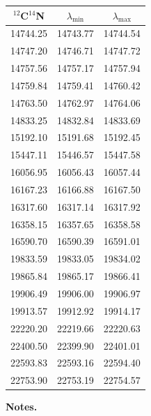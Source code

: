 \documentclass{article}
\begin{document}
\begin{table}[h!]
    \begin{center}
      \vfill
      \begin{tabular}{ccc}
        \hline
        \hline
        $^{12}$C$^{14}$N & $\lambda_{\mathrm{min}}$ & $\lambda_{\mathrm{max}}$ \\
        \hline
        14744.25 & 14743.77 & 14744.54 \\
        14747.20 & 14746.71 & 14747.72 \\
        14757.56 & 14757.17 & 14757.94 \\
        14759.84 & 14759.41 & 14760.42 \\
        14763.50 & 14762.97 & 14764.06 \\
        14833.25 & 14832.84 & 14833.69 \\
        15192.10 & 15191.68 & 15192.45 \\
        15447.11 & 15446.57 & 15447.58 \\
        16056.95 & 16056.43 & 16057.44 \\
        16167.23 & 16166.88 & 16167.50 \\
        16317.60 & 16317.14 & 16317.92 \\
        16358.15 & 16357.65 & 16358.58 \\
        16590.70 & 16590.39 & 16591.01 \\
        19833.59 & 19833.05 & 19834.02 \\
        19865.84 & 19865.17 & 19866.41 \\
        19906.49 & 19906.00 & 19906.97 \\
        19913.57 & 19912.92 & 19914.17 \\
        22220.20 & 22219.66 & 22220.63 \\
        22400.50 & 22399.90 & 22401.01 \\
        22593.83 & 22593.16 & 22594.40 \\
        22753.90 & 22753.19 & 22754.57 \\
        \hline
        \end{tabular}
      \end{center}
  
    \vspace{0.3cm}
    
    \textbf{Notes.}
    \end{table}
\end{document}
